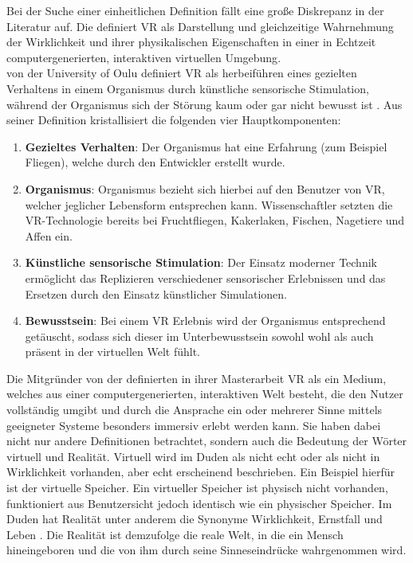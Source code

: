 Bei der Suche einer einheitlichen Definition fällt eine große Diskrepanz in der Literatur auf. Die \citeauthor{BundeszentralefurpolitischeBildung.2018} definiert \ac{VR} als \glqq Darstellung und gleichzeitige Wahrnehmung der Wirklichkeit und ihrer physikalischen Eigenschaften in einer in Echtzeit computergenerierten, interaktiven virtuellen Umgebung\grqq  \cite{BundeszentralefurpolitischeBildung.2018}. \\
\citeauthor{LaValle.2019} von der University of Oulu definiert \ac{VR} als herbeiführen eines gezielten Verhaltens in einem Organismus durch künstliche sensorische Stimulation, während der Organismus sich der Störung kaum oder gar nicht bewusst ist \cite[S. 1]{LaValle.2019}. Aus seiner Definition kristallisiert \citeauthor{LaValle.2019} die folgenden vier Hauptkomponenten:\cite[S. 1,3]{LaValle.2019} 
\begin{enumerate}
	\item \textbf{Gezieltes Verhalten}: Der Organismus hat eine Erfahrung (zum Beispiel Fliegen), welche durch den Entwickler erstellt wurde. 
	\item \textbf{Organismus}: Organismus bezieht sich hierbei auf den Benutzer von \ac{VR}, welcher jeglicher Lebensform entsprechen kann. Wissenschaftler setzten die \ac{VR}-Technologie bereits bei Fruchtfliegen, Kakerlaken, Fischen, Nagetiere und Affen ein. 
	\item \textbf{Künstliche sensorische Stimulation}: Der Einsatz moderner Technik ermöglicht das Replizieren verschiedener sensorischer Erlebnissen und das Ersetzen durch den Einsatz künstlicher Simulationen. 
	\item \textbf{Bewusstsein}: Bei einem \acl{VR} Erlebnis wird der Organismus entsprechend getäuscht, sodass sich dieser im Unterbewusstsein sowohl wohl als auch präsent in der virtuellen Welt fühlt.
\end{enumerate}

Die Mitgründer von der   definierten in ihrer Masterarbeit \ac{VR} als \glqq ein Medium, welches aus einer computergenerierten, interaktiven Welt besteht, die den Nutzer vollständig umgibt und durch die Ansprache ein oder mehrerer Sinne mittels geeigneter Systeme besonders immersiv erlebt werden kann\grqq \cite{omnia.2017}. Sie haben dabei nicht nur andere Definitionen betrachtet, sondern auch die Bedeutung der Wörter virtuell und Realität. Virtuell wird im Duden als \glqq nicht echt \grqq \cite{DudenVirtuell} oder als \glqq nicht in Wirklichkeit vorhanden, aber echt erscheinend\grqq \cite{DudenVirtuell} beschrieben. Ein Beispiel hierfür ist der virtuelle Speicher. Ein virtueller Speicher ist physisch nicht vorhanden, funktioniert aus Benutzersicht jedoch identisch wie ein physischer Speicher. Im Duden hat Realität unter anderem die Synonyme Wirklichkeit, Ernstfall und Leben \cite{DudenRealitaet}. Die Realität ist demzufolge \glqq die reale Welt, in die ein Mensch hineingeboren und die von ihm durch seine Sinneseindrücke wahrgenommen wird\grqq \cite{omnia.2017}.

